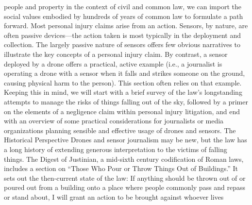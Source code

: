 \begin{itemize}
people and property in the context of civil and common law, we can import
the social values embodied by hundreds of years of common law to formulate
a path forward.
Most personal injury claims arise from an action. Sensors, by nature, are
often passive devices—the action taken is most typically in the deployment
and collection. The largely passive nature of sensors offers few obvious narratives
to illustrate the key concepts of a personal injury claim. By contrast,
a sensor deployed by a drone offers a practical, active example (i.e., a journalist
is operating a drone with a sensor when it falls and strikes someone
on the ground, causing physical harm to the person). This section often
relies on that example.
Keeping this in mind, we will start with a brief survey of the law's longstanding
attempts to manage the risks of things falling out of the sky, followed
by a primer on the elements of a negligence claim within personal injury
litigation, and end with an overview of some practical considerations for
journalists or media organizations planning sensible and effective usage of
drones and sensors.
The Historical Perspective
Drones and sensor journalism may be new, but the law has a long history of
extending generous interpretation to the victims of falling things.
The Digest of Justinian, a mid-sixth century codification of Roman laws,
includes a section on ``Those Who Pour or Throw Things Out of Buildings.''
It sets out the then-current state of the law:
If anything should be thrown out of or poured out from a building
onto a place where people commonly pass and repass or stand
about, I will grant an action to be brought against whoever lives


\end{itemize}
